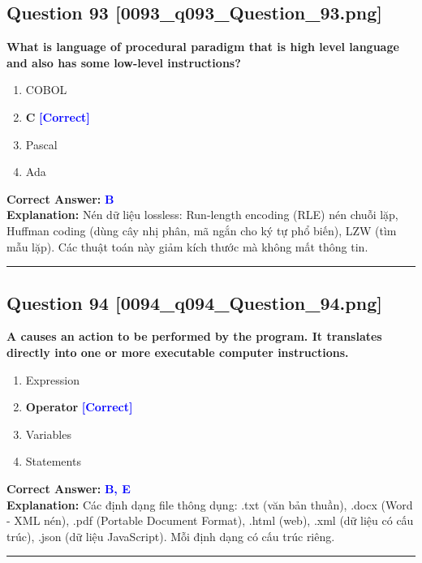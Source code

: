 \documentclass[11pt,a4paper]{article}
\begin{document}
\begin{minipage}{\textwidth}
\subsection*{Question 93 \quad \footnotesize{[0093\_q093\_Question\_93.png]}}
\noindent \textbf{What is language of procedural paradigm that is high level language and also has some low-level instructions?}

\begin{enumerate}[label=\Alph*.]
    \item COBOL
    \item \textbf{C} \hfill \textcolor{blue}{\textbf{[Correct]}}
    \item Pascal
    \item Ada
\end{enumerate}

\noindent \textbf{Correct Answer:} \textcolor{blue}{\textbf{B}} \\[2pt]
\noindent \textbf{Explanation:} Nén dữ liệu lossless: Run-length encoding (RLE) nén chuỗi lặp, Huffman coding (dùng cây nhị phân, mã ngắn cho ký tự phổ biến), LZW (tìm mẫu lặp). Các thuật toán này giảm kích thước mà không mất thông tin.

\par\vspace{0.3cm}
\hrule
\vspace{0.3cm}
\end{minipage}

\begin{minipage}{\textwidth}
\subsection*{Question 94 \quad \footnotesize{[0094\_q094\_Question\_94.png]}}
\noindent \textbf{A causes an action to be performed by the program. It translates directly into one or more executable computer instructions.}

\begin{enumerate}[label=\Alph*.]
    \item Expression
    \item \textbf{Operator} \hfill \textcolor{blue}{\textbf{[Correct]}}
    \item Variables
    \item Statements
\end{enumerate}

\noindent \textbf{Correct Answer:} \textcolor{blue}{\textbf{B, E}} \\[2pt]
\noindent \textbf{Explanation:} Các định dạng file thông dụng: .txt (văn bản thuần), .docx (Word - XML nén), .pdf (Portable Document Format), .html (web), .xml (dữ liệu có cấu trúc), .json (dữ liệu JavaScript). Mỗi định dạng có cấu trúc riêng.

\par\vspace{0.3cm}
\hrule
\vspace{0.3cm}
\end{minipage}
\end{document}
